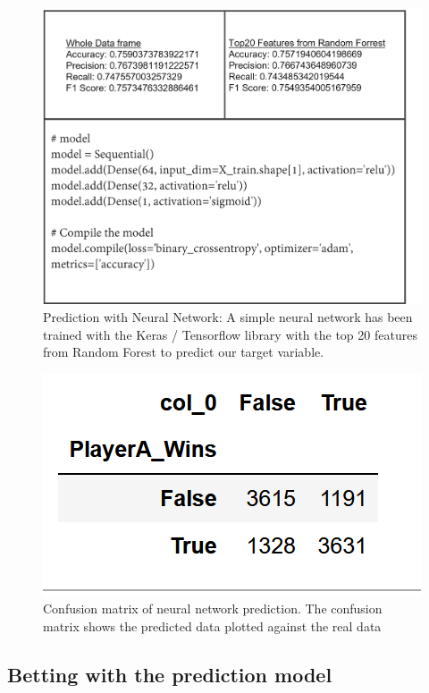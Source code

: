 \documentclass[preprint,aps,nofootinbib,a4paper,superscriptaddress,longbibliography,amsfonts,amssymb,amsmath,titlepage]{revtex4-2}
\begin{document}
%

%
\begin{figure}[h]
\includegraphics[width=\textwidth]{pictures/nn-model.png}
\caption{Prediction with Neural Network: A simple neural network has been trained with the Keras / Tensorflow library with the top 20 features from Random Forest to predict our target variable.}
\label{nn-moodel}
\end{figure}
%

%
\begin{figure}[h]
\includegraphics[width=\textwidth]{pictures/confusion-matrix-nn.png}
\caption{Confusion matrix of neural network prediction. The confusion matrix shows the predicted data plotted against the real data}
\label{confusion-matrix-nn}
\end{figure}
%

\subsection{Betting with the prediction model}
\end{document}

